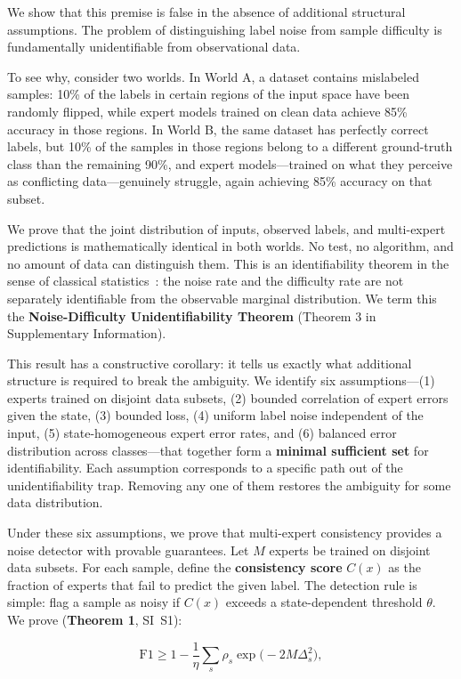 We show that this premise is false in the absence of additional structural assumptions. The problem of distinguishing label noise from sample difficulty is fundamentally unidentifiable from observational data.

To see why, consider two worlds. In World A, a dataset contains mislabeled samples: 10\% of the labels in certain regions of the input space have been randomly flipped, while expert models trained on clean data achieve 85\% accuracy in those regions. In World B, the same dataset has perfectly correct labels, but 10\% of the samples in those regions belong to a different ground-truth class than the remaining 90\%, and expert models---trained on what they perceive as conflicting data---genuinely struggle, again achieving 85\% accuracy on that subset.

We prove that the joint distribution of inputs, observed labels, and multi-expert predictions is mathematically identical in both worlds. No test, no algorithm, and no amount of data can distinguish them. This is an identifiability theorem in the sense of classical statistics~\cite{placeholder}: the noise rate and the difficulty rate are not separately identifiable from the observable marginal distribution. We term this the \textbf{Noise-Difficulty Unidentifiability Theorem} (Theorem 3 in Supplementary Information).

This result has a constructive corollary: it tells us exactly what additional structure is required to break the ambiguity. We identify six assumptions---(1) experts trained on disjoint data subsets, (2) bounded correlation of expert errors given the state, (3) bounded loss, (4) uniform label noise independent of the input, (5) state-homogeneous expert error rates, and (6) balanced error distribution across classes---that together form a \textbf{minimal sufficient set} for identifiability. Each assumption corresponds to a specific path out of the unidentifiability trap. Removing any one of them restores the ambiguity for some data distribution.

Under these six assumptions, we prove that multi-expert consistency provides a noise detector with provable guarantees. Let $M$ experts be trained on disjoint data subsets. For each sample, define the \textbf{consistency score} $C(x)$ as the fraction of experts that fail to predict the given label. The detection rule is simple: flag a sample as noisy if $C(x)$ exceeds a state-dependent threshold $\theta$. We prove (\textbf{Theorem 1}, SI~S1):

\begin{equation}
\mathrm{F1} \geq 1 - \frac{1}{\eta}\sum_{s} \rho_s \exp\bigl(-2M\Delta_s^2\bigr),
\end{equation}

